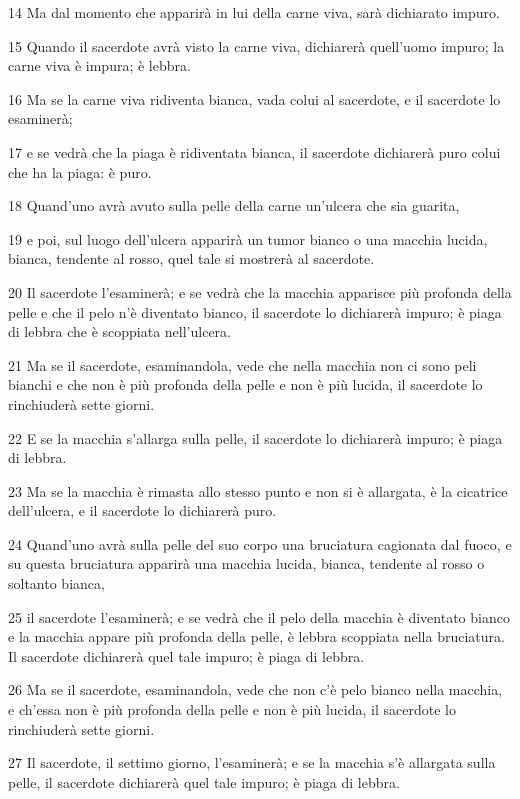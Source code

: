 \par 14 Ma dal momento che apparirà in lui della carne viva, sarà dichiarato impuro.
\par 15 Quando il sacerdote avrà visto la carne viva, dichiarerà quell'uomo impuro; la carne viva è impura; è lebbra.
\par 16 Ma se la carne viva ridiventa bianca, vada colui al sacerdote, e il sacerdote lo esaminerà;
\par 17 e se vedrà che la piaga è ridiventata bianca, il sacerdote dichiarerà puro colui che ha la piaga: è puro.
\par 18 Quand'uno avrà avuto sulla pelle della carne un'ulcera che sia guarita,
\par 19 e poi, sul luogo dell'ulcera apparirà un tumor bianco o una macchia lucida, bianca, tendente al rosso, quel tale si mostrerà al sacerdote.
\par 20 Il sacerdote l'esaminerà; e se vedrà che la macchia apparisce più profonda della pelle e che il pelo n'è diventato bianco, il sacerdote lo dichiarerà impuro; è piaga di lebbra che è scoppiata nell'ulcera.
\par 21 Ma se il sacerdote, esaminandola, vede che nella macchia non ci sono peli bianchi e che non è più profonda della pelle e non è più lucida, il sacerdote lo rinchiuderà sette giorni.
\par 22 E se la macchia s'allarga sulla pelle, il sacerdote lo dichiarerà impuro; è piaga di lebbra.
\par 23 Ma se la macchia è rimasta allo stesso punto e non si è allargata, è la cicatrice dell'ulcera, e il sacerdote lo dichiarerà puro.
\par 24 Quand'uno avrà sulla pelle del suo corpo una bruciatura cagionata dal fuoco, e su questa bruciatura apparirà una macchia lucida, bianca, tendente al rosso o soltanto bianca,
\par 25 il sacerdote l'esaminerà; e se vedrà che il pelo della macchia è diventato bianco e la macchia appare più profonda della pelle, è lebbra scoppiata nella bruciatura. Il sacerdote dichiarerà quel tale impuro; è piaga di lebbra.
\par 26 Ma se il sacerdote, esaminandola, vede che non c'è pelo bianco nella macchia, e ch'essa non è più profonda della pelle e non è più lucida, il sacerdote lo rinchiuderà sette giorni.
\par 27 Il sacerdote, il settimo giorno, l'esaminerà; e se la macchia s'è allargata sulla pelle, il sacerdote dichiarerà quel tale impuro; è piaga di lebbra.
